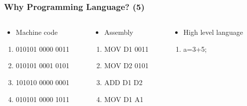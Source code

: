 \begin{frame}
	\frametitle{Why Programming Language? (5)}
\begin{columns}
\begin{column}{0.4\linewidth}
\begin{itemize}
	\item {Machine code}
\end{itemize}
\begin{enumerate}
	\item {010101 0000 0011}
	\item {010101 0001 0101}
	\item {101010 0000 0001}
	\item {010101 0000 1011}
\end{enumerate}
\end{column}
\begin{column}{0.3\linewidth}
\vspace{-0.1in}
\begin{itemize}
	\item {Assembly}
\end{itemize}
\begin{enumerate}
	\item {MOV D1 0011}
	\item {MOV D2 0101}
	\item {ADD D1 D2}
	\item {MOV D1 A1}
\end{enumerate}
\end{column}
\begin{column}{0.25\linewidth}
\vspace{-0.1in}
\begin{itemize}
	\item {High level language}
\end{itemize}
\begin{enumerate}
	\item {a=3+5;}
\end{enumerate}
\end{column}
\end{columns}
\end{frame}

